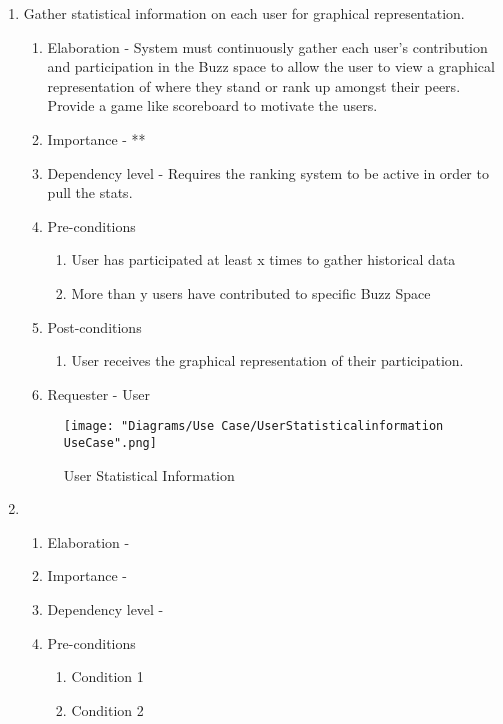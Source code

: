 \documentclass[12pt]{article}
\begin{document}
\begin{enumerate}
\newpage %
   \item Gather statistical information on each user for graphical representation. %
  \begin{enumerate}
    \item Elaboration - System must continuously gather each user’s contribution and participation in the Buzz space to allow the user to view a graphical representation of where they stand or rank up amongst their peers. Provide a game like scoreboard to motivate the users.
    \item Importance - **
    \item Dependency level - Requires the ranking system to be active in order to pull the stats. 
    \item Pre-conditions
    \begin{enumerate}
    	\item User has participated at least x times to gather historical data
    	\item More than y users have contributed to specific Buzz Space
    \end{enumerate}
        \item Post-conditions
    \begin{enumerate}
    	\item User receives the graphical representation of their participation.
    \end{enumerate}
    \item Requester - User
  \end{enumerate}
  \begin{figure}[h]
  	\centering
  	\texttt{[image: "Diagrams/Use Case/UserStatisticalinformation UseCase".png]}
  	\caption{User Statistical Information}
  \end{figure}
\newpage %
   \item  %
  \begin{enumerate}
    \item Elaboration - 
    \item Importance - 
    \item Dependency level - 
    \item Pre-conditions
    \begin{enumerate}
    	\item Condition 1
    	\item Condition 2

\end{enumerate}
\end{enumerate}
\end{enumerate}
\end{document}
